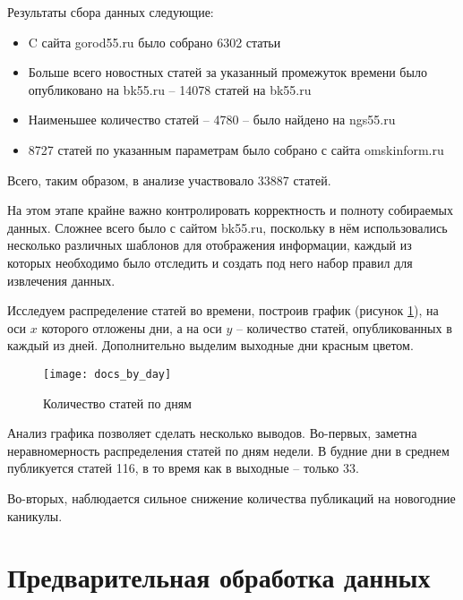 
Результаты сбора данных следующие:
\begin{itemize}
\item C сайта gorod55.ru было собрано 6302 статьи
\item Больше всего новостных статей за указанный промежуток времени было опубликовано на bk55.ru -- 14078 статей  на bk55.ru
\item Наименьшее количество статей -- 4780 -- было найдено на ngs55.ru
\item 8727 статей по указанным параметрам было собрано с сайта omskinform.ru
\end{itemize}

Всего, таким образом, в анализе участвовало 33887 статей.

На этом этапе крайне важно контролировать корректность и полноту собираемых данных. Сложнее всего было с сайтом bk55.ru, поскольку в нём использовались несколько различных шаблонов для отображения информации, каждый из которых необходимо было отследить и создать под него набор правил для извлечения данных.

Исследуем распределение статей во времени, построив график (рисунок \ref{fig:docs_by_day}), на оси $x$ которого отложены дни, а на оси $y$ -- количество статей, опубликованных в каждый из дней. Дополнительно выделим выходные дни красным цветом.

\begin{figure}
	\centering
    \texttt{[image: docs\_by\_day]}
    \caption{Количество статей по дням}
    \label{fig:docs_by_day}
\end{figure}

Анализ графика позволяет сделать несколько выводов. Во-первых, заметна неравномерность распределения статей по дням недели. В будние дни в среднем публикуется статей 116, в то время как в выходные -- только 33. 

Во-вторых, наблюдается сильное снижение количества публикаций на новогодние каникулы.

\section{Предварительная обработка данных}

